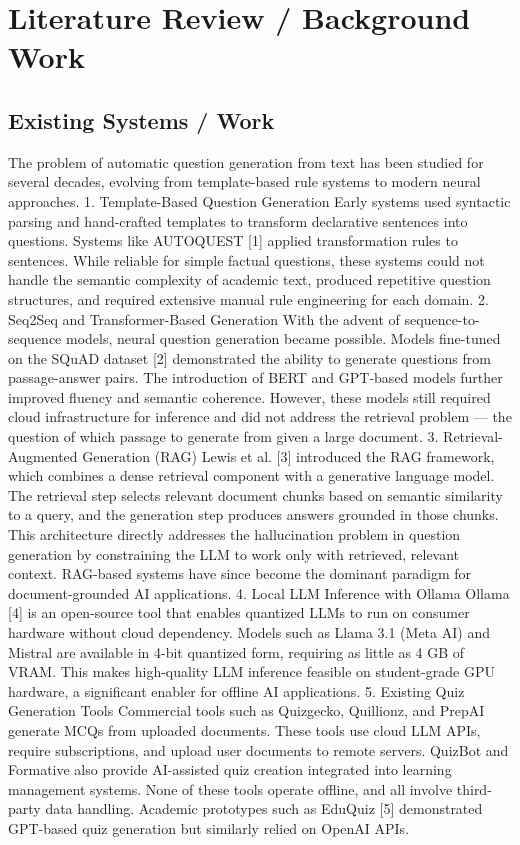 \documentclass[12pt,a4paper]{report}
\begin{document}
\chapter{Literature Review / Background Work}
\section{Existing Systems / Work}
The problem of automatic question generation from text has been studied for several decades, evolving from template-based rule systems to modern neural approaches.
1. Template-Based Question Generation
Early systems used syntactic parsing and hand-crafted templates to transform declarative sentences into questions. Systems like AUTOQUEST [1] applied transformation rules to sentences. While reliable for simple factual questions, these systems could not handle the semantic complexity of academic text, produced repetitive question structures, and required extensive manual rule engineering for each domain.
2. Seq2Seq and Transformer-Based Generation
With the advent of sequence-to-sequence models, neural question generation became possible. Models fine-tuned on the SQuAD dataset [2] demonstrated the ability to generate questions from passage-answer pairs. The introduction of BERT and GPT-based models further improved fluency and semantic coherence. However, these models still required cloud infrastructure for inference and did not address the retrieval problem — the question of which passage to generate from given a large document.
3. Retrieval-Augmented Generation (RAG)
Lewis et al. [3] introduced the RAG framework, which combines a dense retrieval component with a generative language model. The retrieval step selects relevant document chunks based on semantic similarity to a query, and the generation step produces answers grounded in those chunks. This architecture directly addresses the hallucination problem in question generation by constraining the LLM to work only with retrieved, relevant context. RAG-based systems have since become the dominant paradigm for document-grounded AI applications.
4. Local LLM Inference with Ollama
Ollama [4] is an open-source tool that enables quantized LLMs to run on consumer hardware without cloud dependency. Models such as Llama 3.1 (Meta AI) and Mistral are available in 4-bit quantized form, requiring as little as 4 GB of VRAM. This makes high-quality LLM inference feasible on student-grade GPU hardware, a significant enabler for offline AI applications.
5. Existing Quiz Generation Tools
Commercial tools such as Quizgecko, Quillionz, and PrepAI generate MCQs from uploaded documents. These tools use cloud LLM APIs, require subscriptions, and upload user documents to remote servers. QuizBot and Formative also provide AI-assisted quiz creation integrated into learning management systems. None of these tools operate offline, and all involve third-party data handling. Academic prototypes such as EduQuiz [5] demonstrated GPT-based quiz generation but similarly relied on OpenAI APIs.
\end{document}
